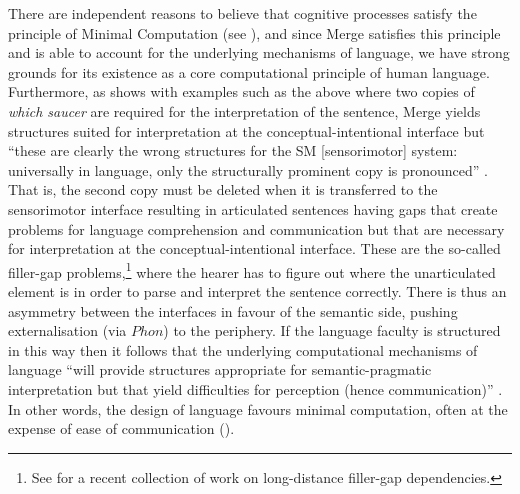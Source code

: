 There are independent reasons to believe that cognitive processes satisfy the principle of Minimal Computation (see \citealt{Cherniak1994,CherniakNodelman2002}), and since Merge satisfies this principle and is able to account for the underlying mechanisms of language, we have strong grounds for its existence as a core computational principle of human language. Furthermore, as \citet{Chomsky2013} shows with examples such as the above where two copies of \textit{which saucer} are required for the interpretation of the sentence, Merge yields structures suited for interpretation at the conceptual-intentional interface but “these are clearly the wrong structures for the SM [sensorimotor] system: universally in language, only the structurally prominent copy is pronounced” \citep[41]{Chomsky2013}. That is, the second copy must be deleted when it is transferred to the sensorimotor interface resulting in articulated sentences having gaps that create problems for language comprehension and communication but that are necessary for interpretation at the conceptual-intentional interface. These are the so-called filler-gap problems,\footnote{See \citet{SprouseHornstein2013} for a recent collection of work on long-distance filler-gap dependencies.} where the hearer has to figure out where the unarticulated element is in order to parse and interpret the sentence correctly. There is thus an asymmetry between the interfaces in favour of the semantic side, pushing externalisation (via $Phon$) to the periphery. If the language faculty is structured in this way then it follows that the underlying computational mechanisms of language “will provide structures appropriate for semantic-pragmatic interpretation but that yield difficulties for perception (hence communication)” \citep[41]{Chomsky2013}. In other words, the design of language favours minimal computation, often at the expense of ease of communication (\citealt{Sigurðsson2004,Burton-Roberts2011,Asoulin2016,Asoulin2020}).


